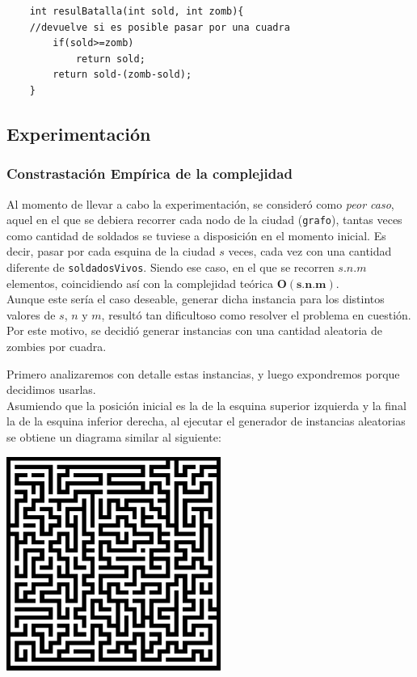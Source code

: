 	\begin{codesnippet}
	\begin{verbatim}
    int resulBatalla(int sold, int zomb){
    //devuelve si es posible pasar por una cuadra
        if(sold>=zomb)
            return sold;
        return sold-(zomb-sold); 
    }
	\end{verbatim}
	\end{codesnippet}

\newpage

\subsection{Experimentaci\'on}
\subsubsection{Constrastaci\'on Emp\'irica de la complejidad}

Al momento de llevar a cabo la experimentaci\'on, se consideró como\emph{ peor caso}, aquel en el que se debiera recorrer cada nodo de la ciudad (\texttt{grafo}), tantas veces como cantidad de soldados se tuviese a disposici\'on en el momento inicial. Es decir, pasar por cada esquina de la ciudad $s$ veces, cada vez con una cantidad diferente de \texttt{soldadosVivos}. Siendo ese caso, en el que se recorren $s.n.m$ elementos, coincidiendo así con la complejidad teórica $\mathbf{O(s.n.m)}$.\\

Aunque este ser\'ia el caso deseable, generar dicha instancia para los distintos valores de $s$, $n$ y $m$, resultó tan dificultoso como resolver el problema en cuestión. Por este motivo, se decidi\'o generar instancias con una cantidad aleatoria de zombies por cuadra.

Primero analizaremos con detalle estas instancias, y luego expondremos porque decidimos usarlas.\\


Asumiendo que la posici\'on inicial es la de la esquina superior izquierda y la final la de la esquina inferior derecha, al ejecutar el generador de instancias aleatorias se obtiene un diagrama similar al siguiente:


\begin{center}
\includegraphics[width=7cm,keepaspectratio=yes]{imagenes/ej2/maze.png}
\end{center}

